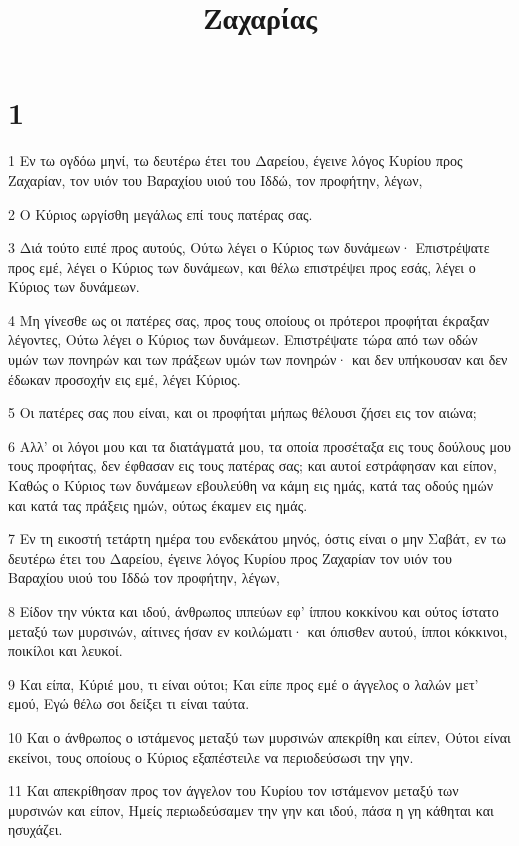 

\title{Ζαχαρίας}


\chapter{1}

\par 1 Εν τω ογδόω μηνί, τω δευτέρω έτει του Δαρείου, έγεινε λόγος Κυρίου προς Ζαχαρίαν, τον υιόν του Βαραχίου υιού του Ιδδώ, τον προφήτην, λέγων,
\par 2 Ο Κύριος ωργίσθη μεγάλως επί τους πατέρας σας.
\par 3 Διά τούτο ειπέ προς αυτούς, Ούτω λέγει ο Κύριος των δυνάμεων· Επιστρέψατε προς εμέ, λέγει ο Κύριος των δυνάμεων, και θέλω επιστρέψει προς εσάς, λέγει ο Κύριος των δυνάμεων.
\par 4 Μη γίνεσθε ως οι πατέρες σας, προς τους οποίους οι πρότεροι προφήται έκραξαν λέγοντες, Ούτω λέγει ο Κύριος των δυνάμεων. Επιστρέψατε τώρα από των οδών υμών των πονηρών και των πράξεων υμών των πονηρών· και δεν υπήκουσαν και δεν έδωκαν προσοχήν εις εμέ, λέγει Κύριος.
\par 5 Οι πατέρες σας που είναι, και οι προφήται μήπως θέλουσι ζήσει εις τον αιώνα;
\par 6 Αλλ' οι λόγοι μου και τα διατάγματά μου, τα οποία προσέταξα εις τους δούλους μου τους προφήτας, δεν έφθασαν εις τους πατέρας σας; και αυτοί εστράφησαν και είπον, Καθώς ο Κύριος των δυνάμεων εβουλεύθη να κάμη εις ημάς, κατά τας οδούς ημών και κατά τας πράξεις ημών, ούτως έκαμεν εις ημάς.
\par 7 Εν τη εικοστή τετάρτη ημέρα του ενδεκάτου μηνός, όστις είναι ο μην Σαβάτ, εν τω δευτέρω έτει του Δαρείου, έγεινε λόγος Κυρίου προς Ζαχαρίαν τον υιόν του Βαραχίου υιού του Ιδδώ τον προφήτην, λέγων,
\par 8 Είδον την νύκτα και ιδού, άνθρωπος ιππεύων εφ' ίππου κοκκίνου και ούτος ίστατο μεταξύ των μυρσινών, αίτινες ήσαν εν κοιλώματι· και όπισθεν αυτού, ίπποι κόκκινοι, ποικίλοι και λευκοί.
\par 9 Και είπα, Κύριέ μου, τι είναι ούτοι; Και είπε προς εμέ ο άγγελος ο λαλών μετ' εμού, Εγώ θέλω σοι δείξει τι είναι ταύτα.
\par 10 Και ο άνθρωπος ο ιστάμενος μεταξύ των μυρσινών απεκρίθη και είπεν, Ούτοι είναι εκείνοι, τους οποίους ο Κύριος εξαπέστειλε να περιοδεύσωσι την γην.
\par 11 Και απεκρίθησαν προς τον άγγελον του Κυρίου τον ιστάμενον μεταξύ των μυρσινών και είπον, Ημείς περιωδεύσαμεν την γην και ιδού, πάσα η γη κάθηται και ησυχάζει.
